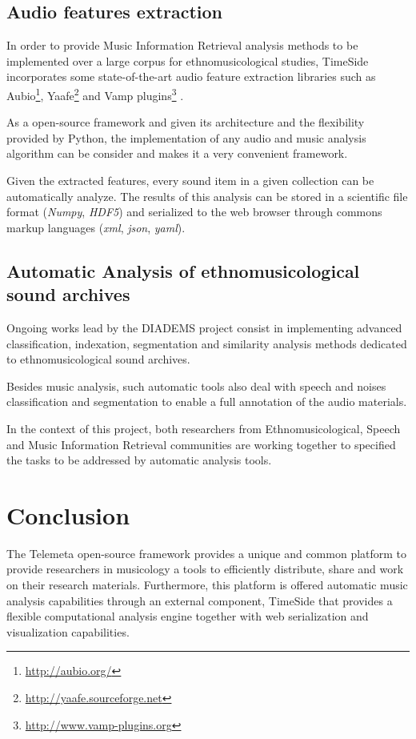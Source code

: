 \documentclass{paper}
\begin{document}
\subsection{Audio features extraction}
In order to provide Music Information Retrieval analysis methods to be implemented over a large corpus for ethnomusicological studies, TimeSide incorporates some state-of-the-art audio feature extraction libraries such as Aubio\footnote{\url{http://aubio.org/}}, Yaafe\footnote{\url{http://yaafe.sourceforge.net}} and Vamp plugins\footnote{ \url{http://www.vamp-plugins.org}} \cite{brossierPhD,yaafe_ISMIR2010,vamp-plugins}.

As a open-source framework and given its architecture and the flexibility provided by Python, the implementation of any audio and music analysis algorithm can be consider and makes it a very convenient framework.

Given the extracted features, every sound item in a given collection can be automatically analyze. The results of this analysis can be stored in a scientific file format (\emph{Numpy}, \emph{HDF5}) and serialized to the web browser through commons markup languages (\emph{xml}, \emph{json}, \emph{yaml}).


\subsection{Automatic Analysis of ethnomusicological sound archives}
Ongoing works lead by the DIADEMS project consist in implementing advanced classification, indexation, segmentation and  similarity analysis methods dedicated to ethnomusicological sound archives.

Besides music analysis, such automatic tools also deal with speech and noises classification and segmentation to enable a full annotation of the audio materials.

In the context of this project, both researchers from Ethnomusicological, Speech and Music Information Retrieval communities are working together to specified the tasks to be addressed by automatic analysis tools.


\section{Conclusion}

The Telemeta open-source framework provides a unique and common platform to provide researchers in musicology a tools to efficiently distribute, share and work on their research materials. Furthermore, this platform is offered automatic music analysis capabilities through an external component, TimeSide that provides a flexible computational analysis engine together with web serialization and visualization capabilities.
\end{document}
